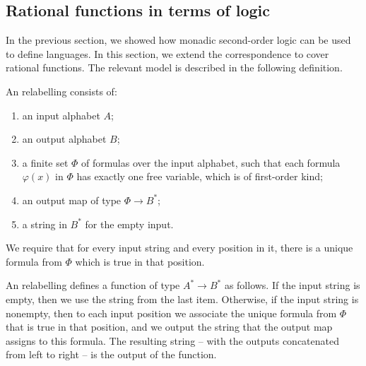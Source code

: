 \subsection{Rational functions in terms of logic}
In the previous section, we showed how monadic second-order logic can be used to define languages. In this section, we extend the correspondence to cover rational functions. The relevant model is described in the following definition. 
\begin{definition}\label{def:mso-relabeling}
    An \mso relabelling consists of: 
    \begin{enumerate}
        \item an input alphabet $A$;
        \item an output alphabet $B$;
        \item \label{item:mso-relabeling-formulas} a finite set $\Phi$ of \mso formulas over the input alphabet, such that each formula $\varphi(x)$ in $\Phi$ has exactly one free variable, which is of first-order kind;
        \item \label{item:mso-relabeling-output-map} an output map of type $\Phi \to B^*$;
        \item  \label{item:mso-relabeling-empty-input} a string in $B^*$ for the empty input.
    \end{enumerate}
    We require that for  every input string  and every position  in it, there is a unique formula from $\Phi$ which is true in that position.
\end{definition}

An \mso relabelling defines a function of type $A^* \to B^*$ as follows. If the input string is empty, then we use the string from the last item. Otherwise, if the input string is nonempty, then to each input position we associate the unique formula from $\Phi$ that is true in that position, and we output the string that the output map assigns to this formula. The resulting string -- with the outputs concatenated from left to right -- is the output of the function. 

